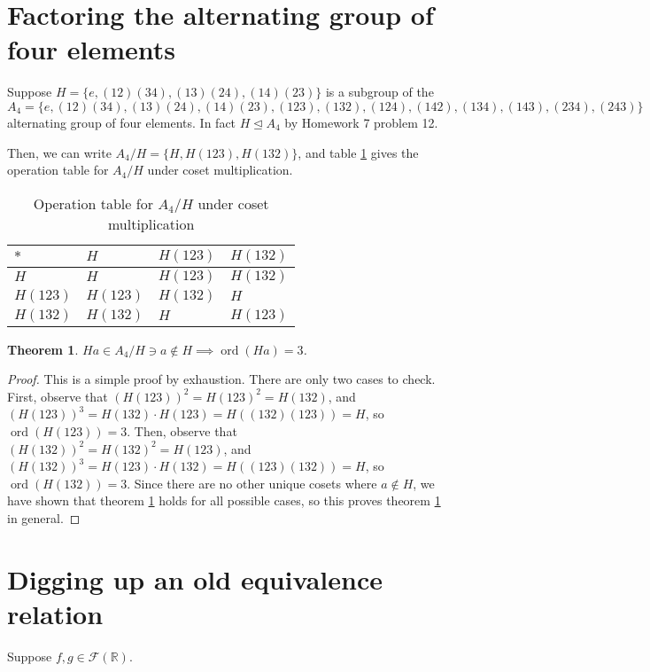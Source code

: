 \documentclass[12pt]{article}
\newcommand{\reals}{\mathbb{R}}
\newcommand{\ord}{\operatorname{ord}}
\newcommand{\freals}{\mathcal{F}(\reals)}
\newtheorem{thm}{Theorem}
\begin{document}
\section{Factoring the alternating group of four elements}

Suppose $H = \{e, (12)(34), (13)(24), (14)(23) \}$ is a subgroup
of the $A_4 = \{e, (12)(34), (13)(24), (14)(23),(123),(132),(124),(142),(134),(143),(234),(243) \}$
alternating group of four elements.
In fact $H \trianglelefteq A_4$ by Homework 7 problem 12.

Then, we can write $A_4/H = \{H, H(123), H(132)\}$,
and table \ref{t4} gives the operation table for
$A_4/H$ under coset multiplication.

\begin{table}[!ht] 
\begin{tabular}{l|lll}
	$*$ & $H$ & $H(123)$ & $H(132)$ \\ \hline
	$H$ & $H$ & $H(123)$ & $H(132)$ \\
	$H(123)$ & $H(123)$ & $H(132)$ & $H$ \\
	$H(132)$ & $H(132)$ & $H$ & $H(123)$ \\
\end{tabular}
\centering
\caption{Operation table for $A_4/H$ under coset multiplication} 
\label{t4}
\end{table}

\begin{thm} \label{thm7}
	$Ha \in A_4/H \ni a \not\in H \implies \ord(Ha) = 3$.	
\end{thm}

\begin{proof}
	This is a simple proof by exhaustion.
	There are only two cases to check.
	First, observe that $(H(123))^2 = H(123)^2 = H(132)$,
	and $(H(123))^3 = H(132) \cdot H(123) = H((132)(123)) = H$,
	so $\ord(H(123)) = 3$.
	Then, observe that $(H(132))^2 = H(132)^2 = H(123)$,
	and $(H(132))^3 = H(123) \cdot H(132) = H((123)(132)) = H$,
	so $\ord(H(132)) = 3$.
	Since there are no other unique cosets where $a \not\in H$,
	we have shown that theorem \ref{thm7} holds for
	all possible cases, so this proves
	theorem \ref{thm7} in general.
\end{proof}

\section{Digging up an old equivalence relation}

Suppose $f,g \in \freals$.
\end{document}
